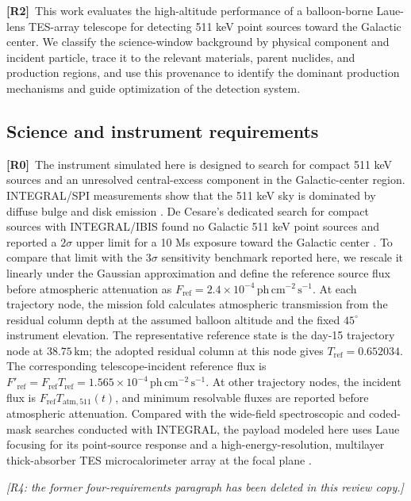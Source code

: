 \documentclass[11pt]{article}
\newcommand{\revmark}[1]{\textcolor{revisionblue}{\textbf{[R#1]}}\ }
\newcommand{\revdeleted}[1]{\par\noindent\textcolor{revisionblue}{\small\itshape [#1]}\par}
\newcommand{\phcms}{\ensuremath{\,\mathrm{ph\,cm^{-2}\,s^{-1}}}}
\newcommand{\fref}{F_{\mathrm{ref}}}
\begin{document}
\revmark{2}This work evaluates the high-altitude performance of a balloon-borne Laue-lens
TES-array telescope for detecting 511 keV point sources toward the Galactic
center. We classify the science-window background by physical component and
incident particle, trace it to the relevant materials, parent nuclides, and
production regions, and use this provenance to identify the dominant production
mechanisms and guide optimization of the detection system.

\subsection{Science and instrument requirements}
\label{sec:requirements}

\begingroup
{}

\revmark{0}The instrument simulated here is designed to search for compact 511 keV sources
and an unresolved central-excess component in the Galactic-center region.
INTEGRAL/SPI measurements show that the 511 keV sky is dominated by diffuse
bulge and disk emission \cite{Siegert2016AA,Yoneda2025}. De Cesare's dedicated
search for compact sources with INTEGRAL/IBIS found no Galactic 511 keV point
sources and reported a $2\sigma$ upper limit for a 10 Ms exposure toward the
Galactic center \cite{DeCesare2011}. To compare that limit with the $3\sigma$
sensitivity benchmark reported here, we rescale it linearly under the Gaussian
approximation and define the reference source flux before atmospheric
attenuation as $\fref=2.4\times10^{-4}\phcms$. At each trajectory node, the
mission fold calculates atmospheric transmission from the residual column depth
at the assumed balloon altitude and the fixed $45^\circ$ instrument elevation.
The representative reference state is the day-15 trajectory node at
$38.75\,\mathrm{km}$; the adopted residual column at this node gives
$T_{\mathrm{ref}}=0.652034$. The corresponding telescope-incident reference
flux is $F'_{\mathrm{ref}}=\fref T_{\mathrm{ref}}=
1.565\times10^{-4}\phcms$. At other trajectory nodes, the incident flux is
$\fref T_{\mathrm{atm},511}(t)$, and minimum resolvable fluxes are reported
before atmospheric attenuation. Compared with the wide-field
spectroscopic and coded-mask searches conducted with INTEGRAL, the payload
modeled here uses Laue focusing for its point-source response and a
high-energy-resolution, multilayer thick-absorber TES microcalorimeter array at
the focal plane \cite{Shirazi2023,Caputo2017}.

\revdeleted{R4: the former four-requirements paragraph has been deleted in this review copy.}
\end{document}
